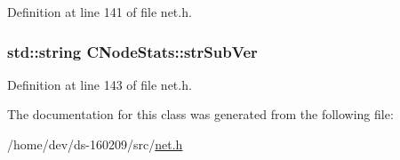 Definition at line 141 of file net.\+h.

\hypertarget{class_c_node_stats_a9029626f81544ffe6727cf63a091974f}{}
\subsubsection[{str\+Sub\+Ver}]{\setlength{\rightskip}{0pt plus 5cm}std\+::string C\+Node\+Stats\+::str\+Sub\+Ver}\label{class_c_node_stats_a9029626f81544ffe6727cf63a091974f}


Definition at line 143 of file net.\+h.



The documentation for this class was generated from the following file\+:\begin{DoxyCompactItemize}
\item 
/home/dev/ds-\/160209/src/\hyperlink{net_8h}{net.\+h}\end{DoxyCompactItemize}
